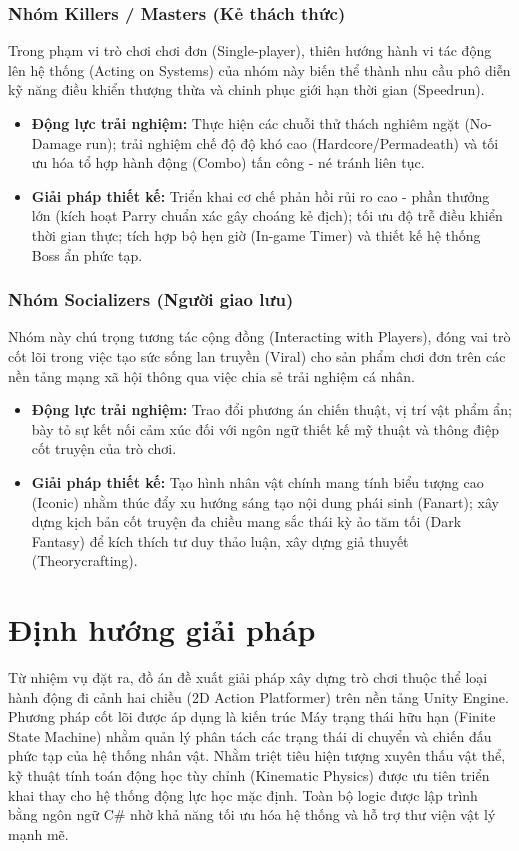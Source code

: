 \documentclass[../DoAn.tex]{subfiles}
\begin{document}
\subsubsection{Nhóm Killers / Masters (Kẻ thách thức)}
Trong phạm vi trò chơi chơi đơn (Single-player), thiên hướng hành vi tác động lên hệ thống (Acting on Systems) của nhóm này biến thể thành nhu cầu phô diễn kỹ năng điều khiển thượng thừa và chinh phục giới hạn thời gian (Speedrun).
\begin{itemize}
    \item \textbf{Động lực trải nghiệm:} Thực hiện các chuỗi thử thách nghiêm ngặt (No-Damage run); trải nghiệm chế độ độ khó cao (Hardcore/Permadeath) và tối ưu hóa tổ hợp hành động (Combo) tấn công - né tránh liên tục.
    \item \textbf{Giải pháp thiết kế:} Triển khai cơ chế phản hồi rủi ro cao - phần thưởng lớn (kích hoạt Parry chuẩn xác gây choáng kẻ địch); tối ưu độ trễ điều khiển thời gian thực; tích hợp bộ hẹn giờ (In-game Timer) và thiết kế hệ thống Boss ẩn phức tạp.
\end{itemize}

\subsubsection{Nhóm Socializers (Người giao lưu)}
Nhóm này chú trọng tương tác cộng đồng (Interacting with Players), đóng vai trò cốt lõi trong việc tạo sức sống lan truyền (Viral) cho sản phẩm chơi đơn trên các nền tảng mạng xã hội thông qua việc chia sẻ trải nghiệm cá nhân.
\begin{itemize}
    \item \textbf{Động lực trải nghiệm:} Trao đổi phương án chiến thuật, vị trí vật phẩm ẩn; bày tỏ sự kết nối cảm xúc đối với ngôn ngữ thiết kế mỹ thuật và thông điệp cốt truyện của trò chơi.
    \item \textbf{Giải pháp thiết kế:} Tạo hình nhân vật chính mang tính biểu tượng cao (Iconic) nhằm thúc đẩy xu hướng sáng tạo nội dung phái sinh (Fanart); xây dựng kịch bản cốt truyện đa chiều mang sắc thái kỳ ảo tăm tối (Dark Fantasy) để kích thích tư duy thảo luận, xây dựng giả thuyết (Theorycrafting).
\end{itemize}
\section{Định hướng giải pháp}
\label{section:1.4}

Từ nhiệm vụ đặt ra, đồ án đề xuất giải pháp xây dựng trò chơi thuộc thể loại hành động đi cảnh hai chiều (2D Action Platformer) trên nền tảng Unity Engine. Phương pháp cốt lõi được áp dụng là kiến trúc Máy trạng thái hữu hạn (Finite State Machine) nhằm quản lý phân tách các trạng thái di chuyển và chiến đấu phức tạp của hệ thống nhân vật. Nhằm triệt tiêu hiện tượng xuyên thấu vật thể, kỹ thuật tính toán động học tùy chỉnh (Kinematic Physics) được ưu tiên triển khai thay cho hệ thống động lực học mặc định. Toàn bộ logic được lập trình bằng ngôn ngữ C\# nhờ khả năng tối ưu hóa hệ thống và hỗ trợ thư viện vật lý mạnh mẽ.
\end{document}
